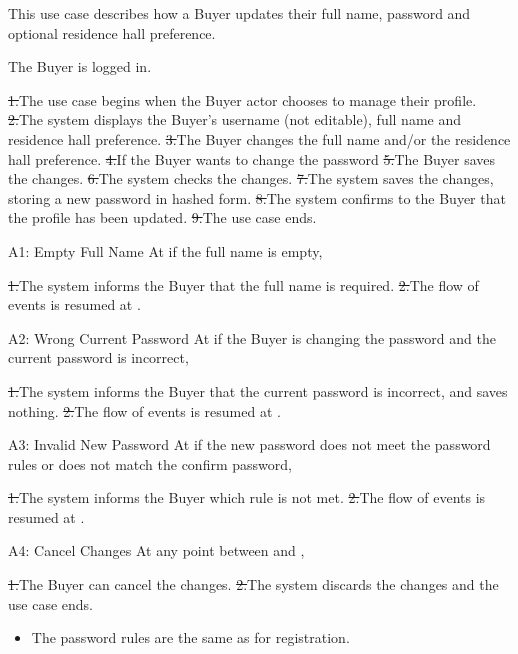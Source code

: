 This use case describes how a Buyer updates their full name, password and optional residence hall preference.\par
{}
The Buyer is logged in.\par
{}
\st{1.}{The use case begins when the Buyer actor chooses to manage their profile.}
\st{2.}{The system displays the Buyer's username (not editable), full name and residence hall preference.}
\st{3.}{The Buyer changes the full name and/or the residence hall preference.}
\st{4.}{If the Buyer wants to change the password}
\st{5.}{The Buyer saves the changes.}
\st{6.}{The system checks the changes.}
\st{7.}{The system saves the changes, storing a new password in hashed form.}
\st{8.}{The system confirms to the Buyer that the profile has been updated.}
\st{9.}{The use case ends.}
\begin{flowblock}{A1: Empty Full Name}
At  if the full name is empty,\par
\st{1.}{The system informs the Buyer that the full name is required.}
\st{2.}{The flow of events is resumed at .}
\end{flowblock}
\begin{flowblock}{A2: Wrong Current Password}
At  if the Buyer is changing the password and the current password is incorrect,\par
\st{1.}{The system informs the Buyer that the current password is incorrect, and saves nothing.}
\st{2.}{The flow of events is resumed at .}
\end{flowblock}
\begin{flowblock}{A3: Invalid New Password}
At  if the new password does not meet the password rules or does not match the confirm password,\par
\st{1.}{The system informs the Buyer which rule is not met.}
\st{2.}{The flow of events is resumed at .}
\end{flowblock}
\begin{flowblock}{A4: Cancel Changes}
At any point between  and ,\par
\st{1.}{The Buyer can cancel the changes.}
\st{2.}{The system discards the changes and the use case ends.}
\end{flowblock}
\begin{itemize}
  \item The password rules are the same as for registration.
\end{itemize}

